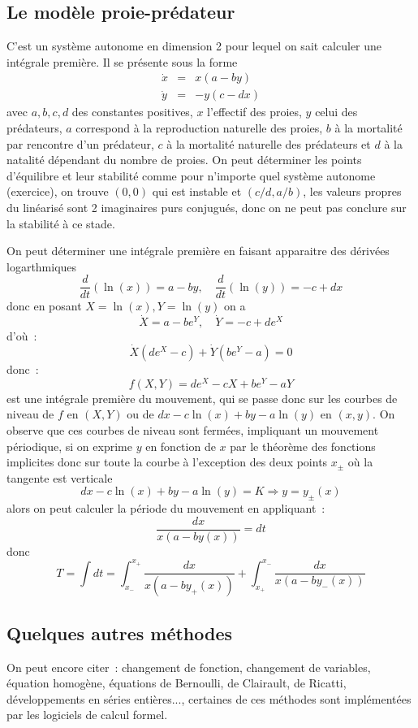 \documentclass[a4paper,11pt]{book}
\begin{document}
\begin{giacjshere}
\subsection{Le mod\`ele proie-pr\'edateur}
C'est un syst\`eme autonome en dimension 2 pour lequel on sait
calculer une int\'egrale premi\`ere. Il se pr\'esente sous la forme
\begin{eqnarray*}
\dot{x}&=&x(a-by)\\
\dot{y}&=&-y(c-dx)
\end{eqnarray*}
avec $a,b,c,d$ des constantes positives, $x$ l'effectif des proies,
$y$ celui des pr\'edateurs,
$a$ correspond \`a la reproduction naturelle des proies, 
$b$ \`a la mortalit\'e par
rencontre d'un pr\'edateur, $c$ \`a la mortalit\'e naturelle
des pr\'edateurs et $d$ \`a la natalit\'e d\'ependant du nombre de
proies.
On peut d\'eterminer les points d'\'equilibre et leur stabilit\'e
comme pour n'importe quel syst\`eme autonome (exercice),
on trouve $(0,0)$  qui est instable et $(c/d,a/b)$, les valeurs propres
du lin\'earis\'e 
sont 2 imaginaires purs conjugu\'es, donc on ne peut pas conclure sur
la stabilit\'e \`a ce stade.

On peut d\'eterminer une int\'egrale premi\`ere en faisant apparaitre
des d\'eriv\'ees logarthmiques
$$ \frac{d}{dt}(\ln(x))=a-by, \quad \frac{d}{dt}(\ln(y))=-c+dx $$
donc en posant $X=\ln(x), Y=\ln(y)$ on a
$$ \dot{X}=a-be^Y, \quad \dot{Y}=-c+de^X$$
d'o\`u~:
$$ \dot{X} (de^X-c) + \dot{Y}(be^Y-a)=0$$
donc~:
$$ f(X,Y)=de^X-cX+be^Y-aY$$
est une int\'egrale premi\`ere du mouvement, qui se passe donc sur
les courbes de niveau de $f$ en $(X,Y)$ ou de $dx-c\ln(x)+by-a\ln(y)$
en $(x,y)$. On observe que ces courbes de niveau sont ferm\'ees, 
impliquant un mouvement p\'eriodique, si on exprime $y$ en fonction
de $x$ par le th\'eor\`eme des fonctions implicites donc sur toute la
courbe \`a l'exception des deux points $x_\pm$ o\`u la tangente est verticale
$$dx-c\ln(x)+by-a\ln(y)=K \Rightarrow y=y_{\pm}(x)$$
alors on peut calculer la p\'eriode du mouvement en appliquant~:
$$ \frac{dx}{x(a-by(x))}=dt$$
donc
$$ T=\int dt = \int_{x_-}^{x_+}  \frac{dx}{x(a-by_+(x))}
+ \int_{x_+}^{x_-}  \frac{dx}{x(a-by_-(x))}
$$

\subsection{Quelques autres m\'ethodes}
On peut encore citer~: 
changement de fonction, changement de variables, 
\'equation homog\`ene, \'equations de Bernoulli,
de Clairault, de Ricatti, d\'eveloppements en s\'eries
enti\`eres..., certaines de ces m\'ethodes sont
impl\'ement\'ees par les logiciels de calcul formel.


\end{giacjshere}
\end{document}
